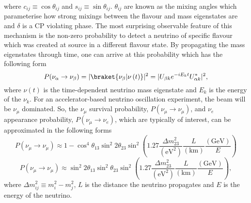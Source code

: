 where $c_{ij} \equiv \cos\theta_{ij}$ and $s_{ij} \equiv \sin\theta_{ij}$. $\theta_{ij}$ are known as the mixing angles which parameterise how strong mixings between the flavour and mass eigenstates are and $\delta$ is a CP violating phase.  The most surprising observable feature of this mechanism is the non-zero probability to detect a neutrino of specific flavour which was created at source in a different flavour state.  By propagating the mass eigenstates through time, one can arrive at this probability which has the following form 
\begin{equation}
P(\nu_\alpha \rightarrow \nu_\beta) = |\braket{\nu_\beta|\nu\left(t\right)}|^2 = |U_{\beta k} e^{-iE_{k}t}  U^{\ast}_{\alpha k}|^2,
\label{eq:NeutrinoOscillationProbability}
\end{equation}
where $\nu\left(t\right)$ is the time-dependent neutrino mass eigenstate and $E_k$ is the energy of the $\nu_k$.  For an accelerator-based neutrino oscillation experiment, the beam will be $\nu_\mu$ dominated.  So, the $\nu_\mu$ survival probability, $P(\nu_\mu \rightarrow \nu_\mu)$, and $\nu_e$ appearance probability, $P(\nu_\mu \rightarrow \nu_e)$, which are typically of interest, can be approximated in the following forms
\begin{equation}
P(\nu_\mu \rightarrow \nu_\mu) \approx 1 - \cos^{4}\theta_{13}\sin^{2}2\theta_{23}\sin^2\left(1.27\frac{\Delta m^{2}_{23}}{\left(\textrm{eV}^2\right)}\frac{L}{\left(\textrm{km}\right)}\frac{\left(\textrm{GeV}\right)}{E}\right)
  \label{eq:MuonNeutrinoSurvivalProbability}
\end{equation}
\begin{equation}
P(\nu_\mu \rightarrow \nu_\mu) \approx \sin^{2}2\theta_{13}\sin^{2}\theta_{23}\sin^2\left(1.27\frac{\Delta m^{2}_{23}}{\left(\textrm{eV}^2\right)}\frac{L}{\left(\textrm{km}\right)}\frac{\left(\textrm{GeV}\right)}{E}\right),
  \label{eq:ElectronNeutrinoAppearanceProbability}
\end{equation}
where $\Delta m^{2}_{ij} \equiv m^{2}_{i} - m^{2}_{j}$, $L$ is the distance the neutrino propagates and $E$ is the energy of the neutrino.

